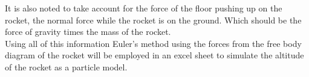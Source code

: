 \documentclass{article}
\begin{document}
    It is also noted to take account for the force of the floor pushing up on the rocket, the normal force while the rocket is on the ground. Which should be the force of gravity times the mass of the rocket.\\

    Using all of this information Euler's method using the forces from the free body diagram of the rocket will be employed in an excel sheet to simulate the altitude of the rocket as a particle model.
\end{document}
